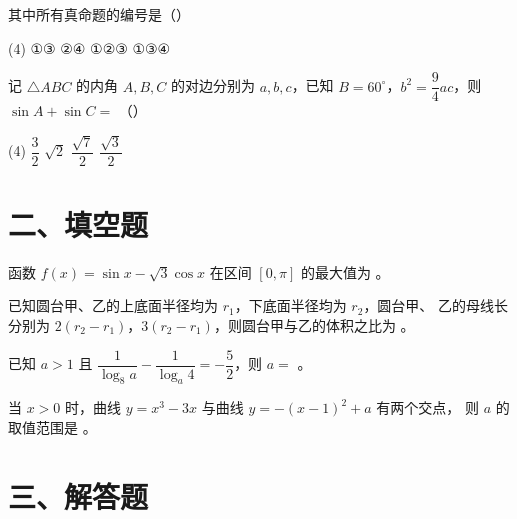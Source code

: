 \documentclass[UTF8,12pt]{ctexart}
\newcommand{\blank}{\underline{\hspace{4em}}}                %
\newcommand{\choiceparen}{（\hspace{2em}）}                    %
\begin{document}
\begin{questions}
    其中所有真命题的编号是\choiceparen{}

    \begin{tasks}(4)
      \task ①③
      \task ②④
      \task ①②③
      \task ①③④
    \end{tasks}

  \item 记 $\triangle ABC$ 的内角 $A, B, C$ 的对边分别为 $a, b, c$，已知
    $B = 60^{\circ}$，$b^{2} = \dfrac{9}{4}ac$，则 $\sin A + \sin C =$ \choiceparen{}
    \begin{tasks}(4)
      \task $\dfrac{3}{2}$
      \task $\sqrt{2}$
      \task $\dfrac{\sqrt{7}}{2}$
      \task $\dfrac{\sqrt{3}}{2}$
    \end{tasks}

\end{questions}

\section*{二、填空题}

\begin{questions}[start=13]

  \item 函数 $f(x) = \sin x - \sqrt{3} \cos x$ 在区间 $[0, \pi]$ 的最大值为 \blank。

  \item 已知圆台甲、乙的上底面半径均为 $r_1$，下底面半径均为 $r_2$，圆台甲、
    乙的母线长分别为 $2(r_2 - r_1)$，$3(r_2 - r_1)$，则圆台甲与乙的体积之比为 \blank。

  \item 已知 $a > 1$ 且 $\dfrac{1}{\log_8 a} - \dfrac{1}{\log_a 4} = -\dfrac{5}{2}$，则
    $a =$ \blank。

  \item 当 $x > 0$ 时，曲线 $y = x^{3} - 3x$ 与曲线 $y = -(x - 1)^{2} + a$ 有两个交点，
    则 $a$ 的取值范围是 \blank。

\end{questions}

\section*{三、解答题}
\end{document}
